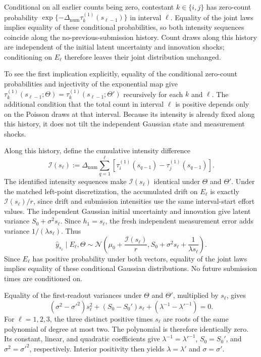 \documentclass[mnsc]{informs3}
\begin{document}
\begin{APPENDICES}
{Conditional on all earlier counts being zero, contestant $k\in\{i,j\}$ has zero-count probability $\exp\{-\Delta_{\mathrm{num}}\tau_k^{(1)}(s_{\ell-1})\}$ in interval $\ell$. Equality of the joint laws implies equality of these conditional probabilities, so both intensity sequences coincide along the no-previous-submission history. Count draws along this history are independent of the initial latent uncertainty and innovation shocks; conditioning on $E_\ell$ therefore leaves their joint distribution unchanged.

To see the first implication explicitly, equality of the conditional
zero-count probabilities and injectivity of the exponential map give
$\tau_k^{(1)}(s_{\ell-1};\Theta)
=\tau_k^{(1)}(s_{\ell-1};\Theta')$ recursively for each $k$ and $\ell$.
The additional condition that the total count in interval $\ell$ is
positive depends only on the Poisson draws at that interval. Because its
intensity is already fixed along this history, it does not tilt the
independent Gaussian state and measurement shocks.

Along this history, define the cumulative intensity difference
\begin{equation}\label{eq-local-id-A}
{\mathscr I}(s_\ell):=\Delta_{\mathrm{num}}\sum_{q=1}^{\ell}
\left[\tau_i^{(1)}(s_{q-1})-\tau_j^{(1)}(s_{q-1})\right].
\end{equation}
The identified intensity sequences make ${\mathscr I}(s_\ell)$ identical under $\Theta$ and $\Theta'$.
Under the matched left-point discretization, the accumulated drift on $E_\ell$ is exactly ${\mathscr I}(s_\ell)/r$, since drift and submission intensities use the same interval-start effort values.
The independent Gaussian initial uncertainty and innovation give latent variance $S_0+\sigma^2s_\ell$. Since $h_1=s_\ell$, the fresh independent measurement error adds variance $1/(\lambda s_\ell)$. Thus
\begin{equation}\label{eq-local-id-conditional-law}
\hat y_{s_\ell}\mid E_\ell,\Theta
\sim\mathcal N\!\left(
\mu_0+\frac{{\mathscr I}(s_\ell)}r,
S_0+\sigma^2s_\ell+\frac{1}{\lambda s_\ell}
\right).
\end{equation}
Since $E_\ell$ has positive probability under both vectors, equality of the joint laws implies equality of these conditional Gaussian distributions. No future submission times are conditioned on.

Equality of the first-readout variances under $\Theta$ and $\Theta'$, multiplied by $s_\ell$, gives
\[
(\sigma^2-\sigma'^2)s_\ell^2
+(S_0-S_0')s_\ell
+\left(\lambda^{-1}-\lambda'^{-1}\right)=0.
\]
For $\ell=1,2,3$, the three distinct positive times $s_\ell$ are roots
of the same polynomial of degree at most two. The polynomial is therefore
identically zero. Its constant, linear, and quadratic coefficients give
$\lambda^{-1}=\lambda'^{-1}$, $S_0=S_0'$, and
$\sigma^2=\sigma'^2$, respectively. Interior positivity then yields
$\lambda=\lambda'$ and $\sigma=\sigma'$.

}
\end{APPENDICES}
\end{document}
